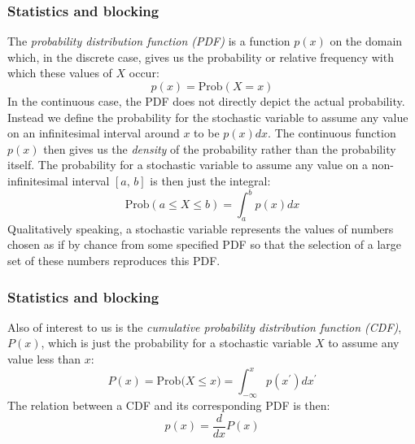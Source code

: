 \documentclass[compress]{beamer}
\newcommand{\bdm}{\begin{displaymath}}
\newcommand{\edm}{\end{displaymath}}
\newcommand{\prob}[0]{\mathrm{Prob}} %
\begin{document}




\frame
{
  \frametitle{Statistics and blocking}
\begin{small}
{\scriptsize
The \emph{probability distribution function (PDF)} is a function
$p(x)$ on the domain which, in the discrete case, gives us the
probability or relative frequency with which these values of $X$
occur:
\bdm
p(x) = \prob(X=x)
\edm
In the continuous case, the PDF does not directly depict the
actual probability. Instead we define the probability for the
stochastic variable to assume any value on an infinitesimal interval
around $x$ to be $p(x)dx$. The continuous function $p(x)$ then gives us
the \emph{density} of the probability rather than the probability
itself. The probability for a stochastic variable to assume any value
on a non-infinitesimal interval $[a,\,b]$ is then just the integral:
\bdm
\prob(a\leq X\leq b) = \int_a^b p(x)dx
\edm
Qualitatively speaking, a stochastic variable represents the values of
numbers chosen as if by chance from some specified PDF so that the
selection of a large set of these numbers reproduces this PDF.
}
\end{small}
}


\frame
{
  \frametitle{Statistics and blocking}
\begin{small}
{\scriptsize
Also of interest to us is the \emph{cumulative probability
distribution function (CDF)}, $P(x)$, which is just the probability
for a stochastic variable $X$ to assume any value less than $x$:
\bdm
P(x)=\mathrm{Prob(}X\leq x\mathrm{)} =
\int_{-\infty}^x p(x^{\prime})dx^{\prime}
\edm
The relation between a CDF and its corresponding PDF is then:
\bdm
p(x) = \frac{d}{dx}P(x)
\edm
}
\end{small}
}
\end{document}
